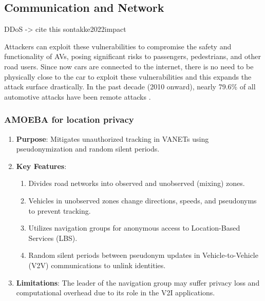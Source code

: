 \subsection{Communication and Network}\label{subsec:v2x-communication-and-network}

DDoS -> cite this sontakke2022impact

Attackers can exploit these vulnerabilities to compromise the safety and functionality of AVs, posing significant risks to passengers, pedestrians, and other road users.
Since now cars are connected to the internet, there is no need to be physically close to the car to exploit these vulnerabilities and this expands the attack surface drastically.
In the past decade (2010 onward), nearly 79.6\% of all automotive attacks have been
remote attacks \cite{cybersec}.

\subsubsection{AMOEBA for location privacy}
\begin{enumerate}
    \item \textbf{Purpose}: Mitigates unauthorized tracking in VANETs using pseudonymization and random silent periods.
    \item \textbf{Key Features}:
    \begin{enumerate}
        \item Divides road networks into observed and unobserved (mixing) zones.
        \item Vehicles in unobserved zones change directions, speeds, and pseudonyms to prevent tracking.
        \item Utilizes navigation groups for anonymous access to Location-Based Services (LBS).
        \item Random silent periods between pseudonym updates in Vehicle-to-Vehicle (V2V) communications to unlink identities.
    \end{enumerate}
    \item \textbf{Limitations}: The leader of the navigation group may suffer privacy loss and computational overhead due to its role in the V2I applications.
\end{enumerate}

